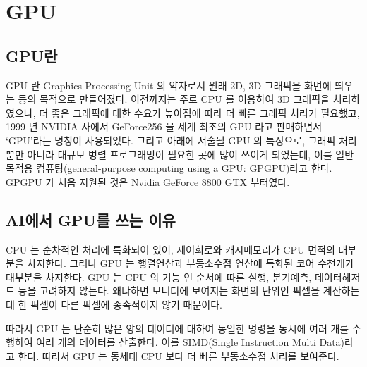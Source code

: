 \section{GPU}
\subsection{GPU란}
GPU 란 Graphics Processing Unit 의 약자로서 원래 2D, 3D 그래픽을 화면에 띄우는 등의
목적으로 만들어졌다. 이전까지는 주로 CPU 를 이용하여 3D 그래픽을 처리하였으나, 더
좋은 그래픽에 대한 수요가 높아짐에 따라 더 빠른 그래픽 처리가 필요했고, 1999 년
NVIDIA 사에서 GeForce256 을 세계 최초의 GPU 라고 판매하면서 ‘GPU’라는 명칭이
사용되었다. 그리고 아래에 서술될 GPU 의 특징으로, 그래픽 처리 뿐만 아니라 대규모 병렬
프로그래밍이 필요한 곳에 많이 쓰이게 되었는데, 이를 일반목적용 컴퓨팅(general-purpose 
computing using a GPU: GPGPU)라고 한다\cite{william2018comsys}. GPGPU 가 처음 지원된 것은 Nvidia GeForce 8800 GTX 부터였다.
\subsection{AI에서 GPU를 쓰는 이유}
CPU 는 순차적인 처리에 특화되어 있어, 제어회로와 캐시메모리가 CPU 면적의 대부분을
차지한다. 그러나 GPU 는 행렬연산과 부동소수점 연산에 특화된 코어 수천개가 대부분을
차지한다. GPU 는 CPU 의 기능 인 순서에 따른 실행, 분기예측, 데이터헤저드 등을 고려하지
않는다. 왜냐하면 모니터에 보여지는 화면의 단위인 픽셀을 계산하는데 한 픽셀이 다른
픽셀에 종속적이지 않기 때문이다.

따라서 GPU 는 단순히 많은 양의 데이터에 대하여 동일한 명령을 동시에 여러 개를
수행하여 여러 개의 데이터를 산출한다. 이를 SIMD(Single Instruction Multi Data)라고 한다.
따라서 GPU 는 동세대 CPU 보다 더 빠른 부동소수점 처리를 보여준다\cite{nvidia2009opencl}.

